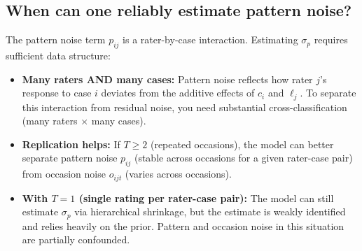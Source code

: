 \subsection*{When can one reliably estimate pattern noise?}

The pattern noise term $p_{ij}$ is a rater-by-case interaction. Estimating $\sigma_p$ requires sufficient data structure:

\begin{itemize}
    \item \textbf{Many raters AND many cases:} Pattern noise reflects how rater $j$'s response to case $i$ deviates from the additive effects of $c_i$ and $\ell_j$. To separate this interaction from residual noise, you need substantial cross-classification (many raters $\times$ many cases).

    \item \textbf{Replication helps:} If $T \geq 2$ (repeated occasions), the model can better separate pattern noise $p_{ij}$ (stable across occasions for a given rater-case pair) from occasion noise $o_{ijt}$ (varies across occasions).

    \item \textbf{With $T=1$ (single rating per rater-case pair):} The model can still estimate $\sigma_p$ via hierarchical shrinkage, but the estimate is weakly identified and relies heavily on the prior. Pattern and occasion noise in this situation are partially confounded.

\end{itemize}
